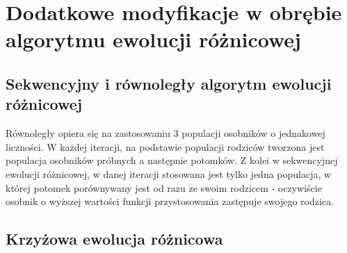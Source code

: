 \chapter{Dodatkowe modyfikacje w obrębie algorytmu ewolucji różnicowej}\label{cha:pierwszyDokument}
\section{Sekwencyjny i równoległy algorytm ewolucji różnicowej }
Równoległy opiera się na zastosowaniu 3 populacji osobników o jednakowej liczności. W każdej iteracji, na podstawie populacji rodziców tworzona
jest populacja osobników próbnych a następnie potomków. Z kolei w sekwencyjnej
ewolucji różnicowej, w danej iteracji stosowana jest tylko jedna populacja, w której potomek porównywany jest od razu ze swoim rodzicem - oczywiście osobnik
o wyższej wartości funkcji przystosowania zastępuje swojego rodzica.

\section{Krzyżowa ewolucja różnicowa}